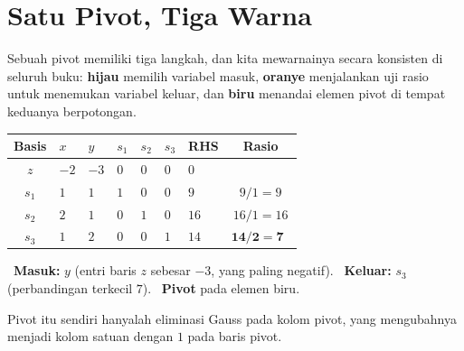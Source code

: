 \section{Satu Pivot, Tiga Warna}
\label{sec:tableau-pivot}

Sebuah pivot memiliki tiga langkah, dan kita mewarnainya secara konsisten di
seluruh buku: {\color{algenter}\textbf{hijau}} memilih variabel masuk,
{\color{algleave}\textbf{oranye}} menjalankan uji rasio untuk menemukan
variabel keluar, dan {\color{algpivot}\textbf{biru}} menandai elemen pivot di
tempat keduanya berpotongan.

\begin{center}
\renewcommand{\arraystretch}{1.3}
\begin{tabular}{c|ZZZZZ|Z|c}
\toprule
Basis & $x$ & $y$ & $s_1$ & $s_2$ & $s_3$ & RHS & Rasio\\
\midrule
$z$   & $-2$ & $-3$ & $0$ & $0$ & $0$ & $0$ & \\
\midrule
$s_1$ & $1$ & $1$ & $1$ & $0$ & $0$ & $9$  & $9/1=9$\\
$s_2$ & $2$ & $1$ & $0$ & $1$ & $0$ & $16$ & $16/1=16$\\
$s_3$ & $1$ & $2$ & $0$ & $0$ & $1$ & $14$ & $\mathbf{14/2=7}$\ \\
\bottomrule
\end{tabular}
\end{center}

\noindent%
{\color{algenter}\ \textbf{Masuk:}} $y$ (entri baris $z$ sebesar $-3$, yang paling negatif).\quad
{\color{algleave}\ \textbf{Keluar:}} $s_3$ (perbandingan terkecil $7$).\quad
{\color{algpivot}\ \textbf{Pivot}} pada elemen biru.

\medskip
Pivot itu sendiri hanyalah eliminasi Gauss pada kolom pivot, yang mengubahnya
menjadi kolom satuan dengan $1$ pada baris pivot.

